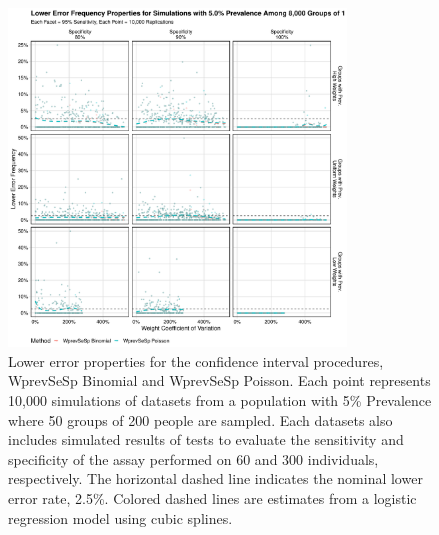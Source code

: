 \documentclass[AMA,STIX1COL]{WileyNJD-v2}
\begin{document}
\begin{figure}
\centering
\includegraphics[width=0.8\textwidth]{figures/imperfect_lower_error_frequency_8000_groups_0_05_prev.pdf}
\caption{Lower error properties for the confidence interval procedures, WprevSeSp Binomial and WprevSeSp Poisson.
Each point represents 10,000 simulations of datasets from a population with 5\% Prevalence where 50 groups of 200 people are sampled.
Each datasets also includes simulated results of tests to evaluate the sensitivity and specificity of the assay performed on 60 and 300 individuals, respectively.
The horizontal dashed line indicates the nominal lower error rate, 2.5\%.
Colored dashed lines are estimates from a logistic regression model using cubic splines.}
\label{fig:imperfect_lower_error_frequency_8000_groups_0_05_prev}
\end{figure}
\end{document}
